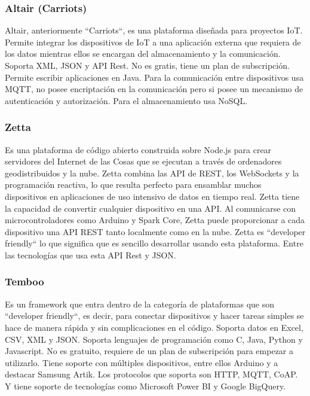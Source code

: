 \subsubsection{Altair (Carriots)}

Altair, anteriormente ``Carriots``, es una plataforma diseñada para proyectos IoT. Permite integrar los dispositivos de IoT a una aplicación externa que requiera de los datos mientras ellos se encargan del almacenamiento y la comunicación. Soporta XML, JSON y API Rest. No es gratis, tiene un plan de subscripción. Permite escribir aplicaciones en Java. Para la comunicación entre dispositivos usa MQTT, no posee encriptación en la comunicación pero si posee un mecanismo de autenticación y autorización. Para el almacenamiento usa NoSQL. \cite{altair}

\subsubsection{Zetta}

Es una plataforma de código abierto construida sobre Node.js para crear servidores del Internet de las Cosas que se ejecutan a través de ordenadores geodistribuidos y la nube. Zetta combina las API de REST, los WebSockets y la programación reactiva, lo que resulta perfecto para ensamblar muchos dispositivos en aplicaciones de uso intensivo de datos en tiempo real. Zetta tiene la capacidad de convertir cualquier dispositivo en una API. Al comunicarse con microcontroladores como Arduino y Spark Core, Zetta puede proporcionar a cada dispositivo una API REST tanto localmente como en la nube. Zetta es ``developer friendly`` lo que significa que es sencillo desarrollar usando esta plataforma. Entre las tecnologías que usa esta API Rest y JSON. \cite{zetta}

\subsubsection{Temboo}

Es un framework que entra dentro de la categoría de plataformas que son ``developer friendly``, es decir, para conectar dispositivos y hacer tareas simples se hace de manera rápida y sin complicaciones en el código. Soporta datos en Excel, CSV, XML y JSON. Soporta lenguajes de programación como C, Java, Python y Javascript. No es gratuito, requiere de un plan de subscripción para empezar a utilizarlo. Tiene soporte con múltiples dispositivos, entre ellos Arduino y a destacar Samsung Artik. Los protocolos que soporta son HTTP, MQTT, CoAP. Y tiene soporte de tecnologías como Microsoft Power BI y Google BigQuery. \cite{temboo}

